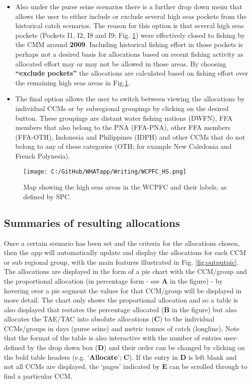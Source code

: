 \documentclass[11pt]{article}
\begin{document}
\begin{itemize}
\item Also under the purse seine scenarios there is a further drop down menu that allows the user to either include or exclude several high seas pockets from the historical catch scenarios. The reason for this option is that several high seas pockets (Pockets I1, I2, I8 and I9; Fig. \ref{fig:HSfig}) were effectively closed to fishing by the CMM around {\bf 2009}. Including historical fishing effort in those pockets is perhaps not a desired basis for allocations based on recent fishing activity as allocated effort may or may not be allowed in those areas. By choosing {\bf ``exclude pockets''} the allocations are calculated based on fishing effort over the remaining high seas areas in Fig.\ref{fig:HSfig}.
\item The final option allows the user to switch between viewing the allocations by individual CCMs or by subregional groupings by clicking on the desired button. These groupings are distant water fishing nations (DWFN), FFA members that also belong to the PNA (FFA-PNA), other FFA members (FFA-OTH), Indonesia and Philippines (IDPH) and other CCMs that do not belong to any of these categories (OTH; for example New Caledonia and French Polynesia).
\end{itemize}

 \begin{figure} [h]
  \centering
\texttt{[image: C:/GitHub/WHATapp/Writing/WCPFC\_HS.png]}
  \caption {Map showing the high seas areas in the WCPFC and their labels, as defined by SPC.}
  \label{fig:HSfig}
\end{figure}

\subsection{Summaries of resulting allocations}
Once a certain scenario has been set and the criteria for the allocations chosen, then the app will automatically update and display the allocations for each CCM or sub regional group, with the main features illustrated in Fig. \ref{fig:outputpic}. The allocations are displayed in the form of a pie chart with the CCM/group and the proportional allocation (in percentage form - see {\bf A} in the figure) - by hovering over a pie segment the values for that CCM/group will be displayed in more detail. The chart only shows the proportional allocation and so a table is also displayed that restates the percentage allocated ({\bf B} in the figure) but also allocates the TAE/TAC into absolute allocations ({\bf C}) to the individual CCMs/groups in days (purse seine) and metric tonnes of catch (longline). Note that the format of the table is also interactive with the number of entries user-defined by the drop down box ({\bf D}) and their order can be changed by clicking on the bold table headers (e.g. `{\bf Allocate}'; {\bf C}). If the entry in {\bf D} is left blank and not all CCMs are displayed, the `pages' indicated by {\bf E} can be scrolled through to find a particular CCM.
\end{document}
